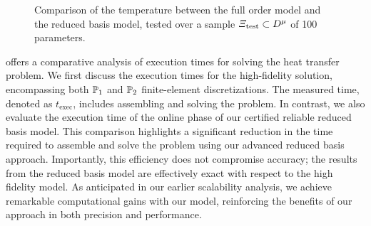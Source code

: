 \begin{figure}
    \centering
    \def\scl{1}
    \def\scl{0.88}
    \subfigure[Stability of the effectivity $\eta_N^s(\mu) = \frac{\Delta_N^s(\mu)}{|T^\fem_O(\mu) - T^{\rbm, N}_O(\mu)|}$ and $\eta_N^\text{en}(\mu) = \frac{\Delta_N^\text{en}(\mu)}{\norm{T^\fem(\mu) - T^{\rbm, N}(\mu)}{\mu}}$ for $\mu\in\Xi_\test$, for various reduced basis sizes. The full red line represents the theoretical lower bound of the effectivity, \textrm{i.e.\ } 1.\label{fig:fem-vs-rbm:effectivity}]{
        
    }

    \caption{Comparison of the temperature between the full order model and the reduced basis model, tested over a sample $\Xi_\test\subset\Dmu$ of 100 parameters.
    }
    \label{fig:fem-vs-rbm}
\end{figure}



 offers a comparative analysis of execution times for solving the heat transfer problem.
We first discuss the execution times for the high-fidelity solution, encompassing both $\P_1$ and $\P_2$  finite-element discretizations.
The measured time, denoted as $t_\text{exec}$, includes assembling and solving the problem.
In contrast, we also evaluate the execution time of the online phase of our certified reliable reduced basis model.
This comparison highlights a significant reduction in the time required to assemble and solve the problem using our advanced reduced basis approach.
Importantly, this efficiency does not compromise accuracy; the results from the reduced basis model are effectively exact with respect to the high fidelity model.
As anticipated in our earlier scalability analysis, we achieve remarkable computational gains with our model, reinforcing the benefits of our approach in both precision and performance.


